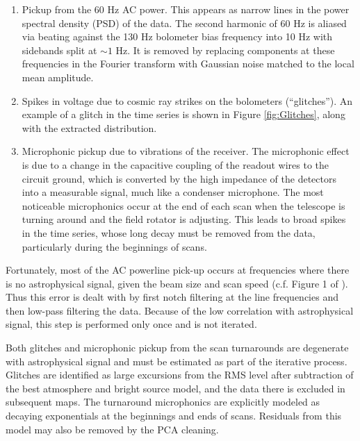 \documentclass[12pt,preprint]{aastex}
\begin{document}
\begin{enumerate}

\item Pickup from the 60 Hz AC power.  This appears as narrow lines in
the power spectral density (PSD) of the data.  The second harmonic of
60 Hz is aliased via beating against the 130 Hz bolometer bias
frequency into 10 Hz with sidebands split at $\sim1$ Hz.  It is
removed by replacing components at these frequencies in the Fourier
transform with Gaussian noise matched to the local mean amplitude.

\item Spikes in voltage due to cosmic ray strikes on the bolometers
(``glitches'').  An example of a glitch in the time series is shown in
Figure \ref{fig:Glitches}, along with the extracted distribution.

\item Microphonic pickup due to vibrations of the receiver.  The
microphonic effect is due to a change in the capacitive coupling of
the readout wires to the circuit ground, which is converted by the
high impedance of the detectors into a measurable signal, much like a
condenser microphone.  The most noticeable microphonics occur at the
end of each scan when the telescope is turning around and the field
rotator is adjusting.  This leads to broad spikes in the time series,
whose long decay must be removed from the data, particularly during
the beginnings of scans.

\end{enumerate}

Fortunately, most of the AC powerline pick-up occurs at frequencies
where there is no astrophysical signal, given the beam size and scan
speed (c.f. Figure 1 of \citet{sayers09}).  Thus this error is dealt
with by first notch filtering at the line frequencies and then
low-pass filtering the data.  Because of the low correlation with
astrophysical signal, this step is performed only once and is not
iterated.

Both glitches and microphonic pickup from the scan turnarounds are
degenerate with astrophysical signal and must be estimated as part of
the iterative process.  Glitches are identified as large excursions
from the RMS level after subtraction of the best atmosphere and bright
source model, and the data there is excluded in
subsequent maps.  The turnaround microphonics are explicitly modeled
as decaying exponentials at the beginnings and ends of scans.
Residuals from this model may also be removed by the PCA cleaning.
\end{document}
